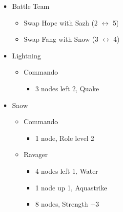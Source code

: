 \begin{paracol}{2}
	\renewcommand{\first}{[1] Strike Team (\com/\syn/\com)}
	\renewcommand{\second}{[2] Tri-Disaster (\rav/\rav/\rav)}
	\renewcommand{\third}{[3] Tri-Disaster (\rav/\rav/\rav)}
	\renewcommand{\fourth}{[4] Cerberus (\com/\com/\com)}
	\renewcommand{\fifth}{[5] Cerberus (\com/\com/\com)}
	\begin{menu}
		\begin{itemize}
			\paradigm
			\begin{itemize}
				\item Battle Team
				      \begin{itemize}
					      \item Swap Hope with Sazh (2 $\leftrightarrow$ 5)
					      \item Swap Fang with Snow (3 $\leftrightarrow$ 4)
				      \end{itemize}
				      {\paradigmline[1]{\textit{\com}}{\textit{\syn}}{\textit{(\com)}}}%
				      {\paradigmline{(\rav)}{\rav}{\rav}}%
				      {\paradigmline{[\rav]}{(\rav)}{(\rav)}}%
				      {\paradigmline{\com}{[\com]}{\com}}%
				      {\paradigmline{\com}{[\com]}{\com}}
			\end{itemize}
			\crystarium
			\begin{itemize}
				\item Lightning
				      \begin{itemize}
					      \item Commando
					            \begin{itemize}
						            \item 3 nodes left 2, Quake
					            \end{itemize}
				      \end{itemize}
				\item Snow
				      \begin{itemize}
					      \item Commando
					            \begin{itemize}
						            \item 1 node, Role level 2
					            \end{itemize}
					      \item Ravager
					            \begin{itemize}
						            \item 4 nodes left 1, Water
						            \item 1 node up 1, Aquastrike
						            \item 8 nodes, Strength +3

\end{itemize}
\end{itemize}
\end{itemize}
\end{itemize}
\end{menu}
\end{paracol}
